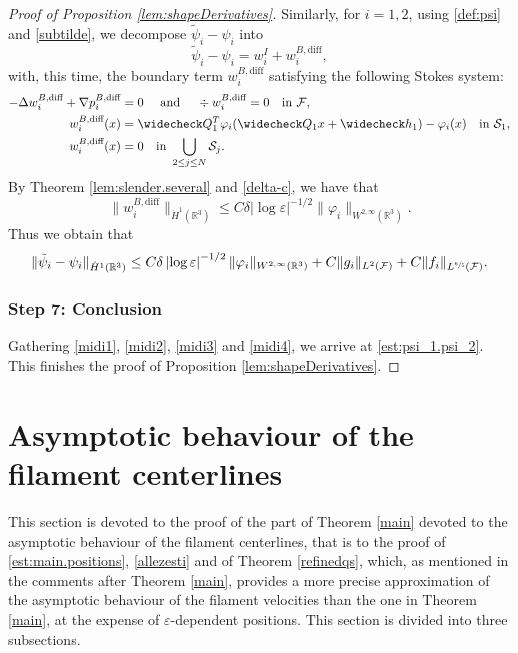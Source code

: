 \documentclass[10pt]{amsart}
\newcommand{\R}{\mathbb{R}}
\let\eps\varepsilon
\theoremstyle{definition}
\theoremstyle{remark}
\begin{document}
\begin{proof}[Proof of Proposition \ref{lem:shapeDerivatives}]
Similarly, for $i=1,2$, using \eqref{def:psi} and \eqref{subtilde}, we decompose $\tilde \psi_i - \psi_i$ into
\[
\tilde \psi_i - \psi_i = w_i^I + w_i^{B,\textrm{diff}},\]
with, this time, the boundary term $w_i^{B,\textrm{diff}}$ satisfying the following Stokes system:
\begin{align*}
- \Delta w_i^{B,\textrm{diff}} + \nabla p_i^{B,\textrm{diff}} &= 0 \quad \text{ and } \quad\div w_i^{B,\textrm{diff}} = 0 \quad \text{in } \mathcal F, \\
w_i^{B,\textrm{diff}}(x) &= \widecheck Q_1^T \varphi_i(\widecheck Q_1 x + \widecheck h_1) - \varphi_i(x) \quad \text{in } \mathcal S_1, \\
w_i^{B,\textrm{diff}}(x) &= 0 \quad \text{in } \bigcup_{2 \leq j \leq N} \mathcal S_j.
\end{align*}
By Theorem \ref{lem:slender.several} and \eqref{delta-c},
we have that
\begin{equation*}
\|w_i^{B,\textrm{diff}}\|_{\dot H^1(\R^3)} \leq C \delta \left|\log \eps\right|^{-1/2} \| \varphi_i\|_{W^{2,\infty} (\R^3)}.
\end{equation*}
Thus
we obtain that
\begin{equation}
\label{midi3}
\|\tilde \psi_i - \psi_i\|_{\dot H^1(\R^3)} \leq C \delta \left|\log \eps\right|^{-1/2}\| \varphi_i\|_{W^{2,\infty} (\R^3)} + C \|g_i\|_{L^2 (\mathcal F)} + C \|f_i\|_{L^{\sfrac 6 5 } (\mathcal F)}.
\end{equation}

\subsubsection*{Step 7: Conclusion} Gathering \eqref{midi1}, \eqref{midi2},
\eqref{midi3} and \eqref{midi4}, we arrive at \eqref{est:psi_1.psi_2}.
This finishes the proof of Proposition \ref{lem:shapeDerivatives}.
\end{proof}

\section{Asymptotic behaviour of the filament centerlines}
\label{gathered-section}
This section is devoted to the proof of the part of Theorem \ref{main} devoted to the asymptotic behaviour of the filament centerlines, that is to the proof of
\eqref{est:main.positions},
\eqref{allezesti} and of
Theorem \ref{refinedqs}, which, as mentioned in the comments after Theorem \ref{main},
provides a more precise approximation of the asymptotic behaviour of the filament velocities than the one in Theorem \ref{main}, at the expense of $\eps$-dependent positions.
This section is divided into three subsections.
\end{document}
